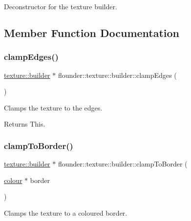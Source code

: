 Deconstructor for the texture builder. 



\subsection{Member Function Documentation}
\mbox{\label{classflounder_1_1texture_1_1builder_a1d71b958407c1c34689bec6ea0ae5893}} 
\subsubsection{\texorpdfstring{clamp\+Edges()}{clampEdges()}}
{\footnotesize\ttfamily \hyperlink{classflounder_1_1texture_1_1builder}{texture\+::builder} $\ast$ flounder\+::texture\+::builder\+::clamp\+Edges (\begin{DoxyParamCaption}{ }\end{DoxyParamCaption})}



Clamps the texture to the edges. 

\begin{DoxyReturn}{Returns}
This. 
\end{DoxyReturn}
\mbox{\label{classflounder_1_1texture_1_1builder_ad072bfe8ecf605c8376886873f66aa9d}} 
\subsubsection{\texorpdfstring{clamp\+To\+Border()}{clampToBorder()}}
{\footnotesize\ttfamily \hyperlink{classflounder_1_1texture_1_1builder}{texture\+::builder} $\ast$ flounder\+::texture\+::builder\+::clamp\+To\+Border (\begin{DoxyParamCaption}\item[{\hyperlink{classflounder_1_1colour}{colour} $\ast$}]{border }\end{DoxyParamCaption})}



Clamps the texture to a coloured border. 


